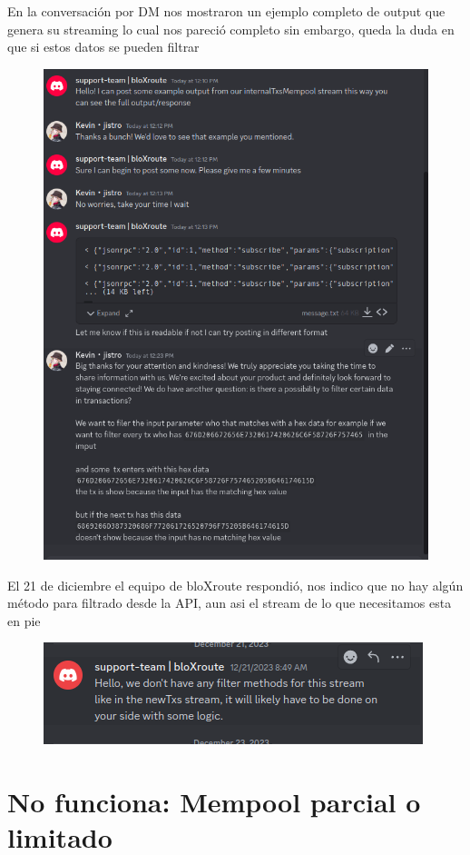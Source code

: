 En la conversación por DM nos mostraron un ejemplo completo de output que genera su streaming lo cual nos pareció completo sin embargo, queda la duda en que si estos datos se pueden filtrar

\begin{figure}
    \centering
    \includegraphics[width=.6\linewidth]{img//screenshots/image12321321321321.png}
\end{figure}

El 21 de diciembre el equipo de bloXroute respondió, nos indico que no hay algún método para filtrado desde la API, aun asi el stream de lo que necesitamos esta en pie 
\begin{figure}
    \centering
    \includegraphics[width=1\linewidth]{img//screenshots/image213213123412.png}
\end{figure}


\clearpage
\section{No funciona: Mempool parcial o limitado}

